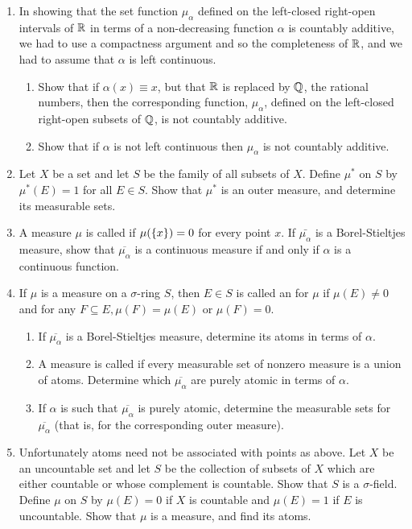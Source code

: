 \begin{enumerate}[label=\arabic*),ref=\arabic*]
\item In showing that the set function $\mu_\alpha$ defined on the left-closed right-open intervals of $\mathbb{R}$ in terms of a non-decreasing function $\alpha$ is countably additive, we had to use a compactness argument and so the completeness of $\mathbb{R}$, and we had to assume that $\alpha$ is left continuous.

\begin{enumerate}
\item Show that if $\alpha(x) \equiv x$, but that $\mathbb{R}$ is replaced by $\mathbb{Q}$, the rational numbers, then the corresponding function, $\mu_\alpha$, defined on the left-closed right-open subsets of $\mathbb{Q}$, is not countably additive.
\item Show that if $\alpha$ is not left continuous then $\mu_\alpha$ is not countably additive.
\end{enumerate}

\item\label{exer:empty meas sets}
Let $X$ be a set and let $S$ be the family of all subsets of $X$. Define $\mu^*$ on $S$ by $\mu^*(E)=1$ for all $E\in S$. Show that $\mu^*$ is an outer measure, and determine its measurable sets.

\item A measure $\mu$ is called  if $\mu(\left\{x\right\})=0$ for every point $x$. If $\bar{\mu_\alpha}$ is a Borel-Stieltjes measure, show that $\overline{\mu_\alpha}$ is a continuous measure if and only if $\alpha$ is a continuous function.

\item If $\mu$ is a measure on a $\sigma$-ring $S$, then $E \in S$ is called an  for $\mu$ if $\mu(E) \neq 0$ and for any $F \subseteq E, \mu(F)=\mu(E)$ or $\mu(F)=0$.
\begin{enumerate}
\item If $\overline{\mu_\alpha}$ is a Borel-Stieltjes measure, determine its atoms in terms of $\alpha$.
\item A measure is called  if every measurable set of nonzero measure is a union of atoms. Determine which $\overline{\mu_\alpha}$ are purely atomic in terms of $\alpha$.
\item If $\alpha$ is such that $\overline{\mu_\alpha}$ is purely atomic, determine the measurable sets for $\overline{\mu_\alpha}$ (that is, for the corresponding outer measure).
\end{enumerate}


\item Unfortunately atoms need not be associated with points as above. Let ${X}$ be an uncountable set and let ${S}$ be the collection of subsets of ${X}$ which are either countable or whose complement is countable. Show that ${S}$ is a $\sigma$-field. Define $\mu$ on ${S}$ by $\mu(E)=0$ if ${X}$ is countable and $\mu(E)=1$ if $E$ is uncountable. Show that $\mu$ is a measure, and find its atoms.


\end{enumerate}

